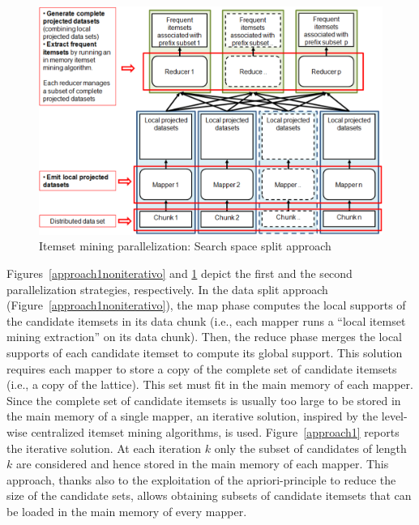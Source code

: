 \documentclass[preprint,review,12pt]{elsarticle}
\begin{document}
\begin{figure}[!t]
\includegraphics[width=5in]{Approach2.eps}
\caption{Itemset mining parallelization: Search space split approach}
\label{approach2}
\end{figure}


Figures~\ref{approach1noniterativo} and \ref{approach2} depict the first and the second parallelization strategies, respectively.  
In the data split approach (Figure~\ref{approach1noniterativo}), the map phase computes the local supports of the candidate itemsets in its data chunk  (i.e., each mapper runs a ``local itemset mining extraction'' on its data chunk). Then, the reduce phase merges the local supports of each candidate itemset to compute its global support. This solution requires each mapper to store a copy of the complete set of candidate itemsets (i.e., a copy of the lattice). 
This set must fit in the main memory of each mapper. Since the complete set of candidate itemsets is usually too large to be stored in the main memory of a single mapper, an iterative solution, inspired by the level-wise centralized itemset mining algorithms, is used. Figure~\ref{approach1} reports the iterative solution. 
At each iteration $k$ only the subset of candidates of length $k$ are considered and hence stored in the main memory of each mapper. This approach, thanks also to the exploitation of the apriori-principle to reduce the size of the candidate sets, allows obtaining subsets of candidate itemsets that can be loaded in the main memory of every mapper.
\end{document}
